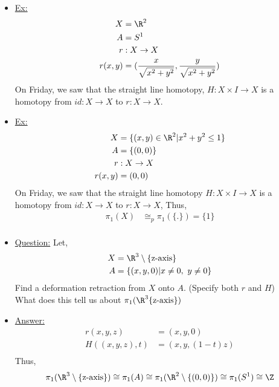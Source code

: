     \begin{itemize}
    \item\underline{Ex:}
        \begin{align*}
            X&=\R^2\\
            A&=S^1\\
            r&:X\rightarrow X\\
            r(x,y)&=(\frac{x}{\sqrt{x^2+y^2}},\frac{y}{\sqrt{x^2+y^2}})
        \end{align*}
        On Friday, we saw that the straight line homotopy, $H:X\times I\rightarrow X$
        is a homotopy from $id:X\rightarrow X$ to $r:X\rightarrow X$.
    \item \underline{Ex:}
        \begin{align*}
            X&=\{(x,y)\in \R^2| x^2+y^2\leq 1\}\\
            A&=\{(0,0)\}\\
            r&: X\rightarrow X\\
            r(x,y)&=(0,0)\\
        \end{align*}
        On Friday, we saw that the straight line homotopy $H:X\times I \rightarrow X$ is
        a homotopy from $id:X\rightarrow X$ to $r:X\rightarrow X$,
        Thus,
        \begin{align*}
            \pi_1(X)&\cong_{p}\pi_1(\{.\})=\{1\}\\
        \end{align*}
    \item \underline{Question:} Let,
        \begin{align*}
            X&=\R^3\setminus \{\text{z-axis}\}\\
            A&=\{(x,y,0)| x\neq 0,\ y\neq 0\}\\
        \end{align*}
        Find a deformation retraction from $X$ onto $A$. (Specify both $r$ and $H$)\\
        What does this tell us about $\pi_1(\R^3\{\text{z-axis}\})$
    \item \underline{Answer:}
        \begin{align*}
            r(x,y,z)&=(x,y,0)\\
            H((x,y,z),t)&=(x,y, (1-t)z)\\
        \end{align*}
        Thus,
        \begin{align*}
            \pi_1(\R^3\setminus\{\text{z-axis}\})\cong \pi_1(A)\cong \pi_1(\R^2\setminus\{(0,0)\})\cong \pi_1(S^1)\cong \Z\\
        \end{align*}
    \end{itemize}
